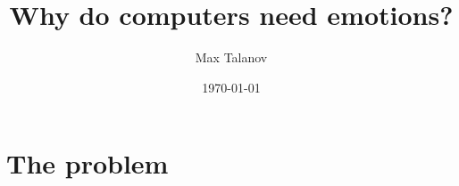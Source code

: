 \documentclass[12pt]{beamer}
\title[Emotional computers]{Why do computers need emotions?} %
\author{Max Talanov} %
\institute[KFU] %
{
Intellectual Robotics ITIS KFU \\ %
\medskip
\textit{max.talanov@gmail.com} %
}
\date{\today} %
\begin{document}
\begin{frame}
\titlepage %
\end{frame}



\section{The problem} %
\end{document}
